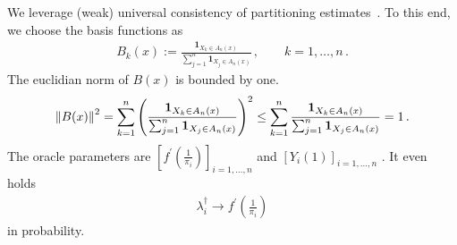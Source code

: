 We leverage (weak) universal consistency
of partitioning estimates~\cite{Gyorfi2002}.
To this end, we choose the basis functions as
\begin{gather*}
  B_k(x)
  :=
  \frac{
  \mathbf{1}_{X_k \in A_n(x)}
  }{
  \sum_{j=1}^{n} 
  \mathbf{1}_{X_j \in A_n(x)}
  }
  \,,
  \qquad
  k=
  1,\ldots,n
  \,.
\end{gather*}
The euclidian norm of 
$
  B(x)
$
is bounded by one.
\begin{gather*}
  \left\lVert B(x)\right\rVert^2
  =
  \sum_{k=1}^{n} 
  \left( 
  \frac{
  \mathbf{1}_{X_k \in A_n(x)}
  }{
  \sum_{j=1}^{n} 
  \mathbf{1}_{X_j \in A_n(x)}
  }
  \right)
  ^2
  \le
  \sum_{k=1}^{n} 
  \frac{
  \mathbf{1}_{X_k \in A_n(x)}
  }{
  \sum_{j=1}^{n} 
  \mathbf{1}_{X_j \in A_n(x)}
  }
  =1
  \,.
\end{gather*}
The oracle parameters are
$
  \left[ 
    f^{'}
    \left( 
      \frac{1}{\pi_i}
    \right)
  \right] _ { i = 1,\ldots,n }
$
and
$
  \left[ 
    Y_i(1)
  \right] _ { i = 1,\ldots,n }
$
.
It even holds
\begin{gather*}
  \lambda ^ \dagger _ i \to 
    f^{'}
    \left( 
      \frac{1}{\pi_i}
    \right)
\end{gather*}
in probability.

